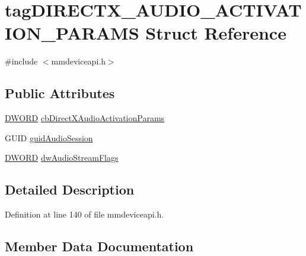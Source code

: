 \hypertarget{structtag_d_i_r_e_c_t_x___a_u_d_i_o___a_c_t_i_v_a_t_i_o_n___p_a_r_a_m_s}{}\section{tag\+D\+I\+R\+E\+C\+T\+X\+\_\+\+A\+U\+D\+I\+O\+\_\+\+A\+C\+T\+I\+V\+A\+T\+I\+O\+N\+\_\+\+P\+A\+R\+A\+MS Struct Reference}
\label{structtag_d_i_r_e_c_t_x___a_u_d_i_o___a_c_t_i_v_a_t_i_o_n___p_a_r_a_m_s}


{\ttfamily \#include $<$mmdeviceapi.\+h$>$}

\subsection*{Public Attributes}
\begin{DoxyCompactItemize}
\item 
\hyperlink{mapinls_8h_ad342ac907eb044443153a22f964bf0af}{D\+W\+O\+RD} \hyperlink{structtag_d_i_r_e_c_t_x___a_u_d_i_o___a_c_t_i_v_a_t_i_o_n___p_a_r_a_m_s_acf9cdda0bbe80ffde3203f997f1446bc}{cb\+Direct\+X\+Audio\+Activation\+Params}
\item 
G\+U\+ID \hyperlink{structtag_d_i_r_e_c_t_x___a_u_d_i_o___a_c_t_i_v_a_t_i_o_n___p_a_r_a_m_s_a12516894fa6abccfb8f46b857868e5cf}{guid\+Audio\+Session}
\item 
\hyperlink{mapinls_8h_ad342ac907eb044443153a22f964bf0af}{D\+W\+O\+RD} \hyperlink{structtag_d_i_r_e_c_t_x___a_u_d_i_o___a_c_t_i_v_a_t_i_o_n___p_a_r_a_m_s_a9b2fd0a5a43f9e1010da1c1e3640acdc}{dw\+Audio\+Stream\+Flags}
\end{DoxyCompactItemize}


\subsection{Detailed Description}


Definition at line 140 of file mmdeviceapi.\+h.



\subsection{Member Data Documentation}
